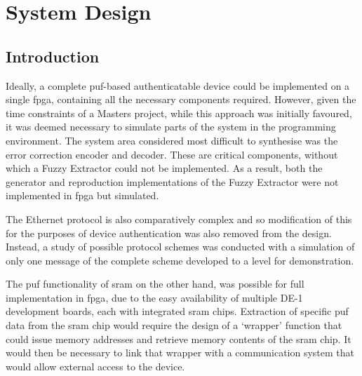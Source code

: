 
\chapter{System Design} %

\label{ch:design}



\section{Introduction}

Ideally, a complete \gls{puf}-based authenticatable device could be implemented
on a single \gls{fpga}, containing all the necessary components required.
However, given the time constraints of a Masters project, while this approach
was initially favoured, it was deemed necessary to simulate parts of the system
in the \matlab programming environment. The system area considered most
difficult to synthesise was the error correction encoder and decoder.
These are critical components, without which a Fuzzy Extractor could not be implemented.
As a result, both the generator and reproduction implementations of the Fuzzy Extractor
were not implemented in \gls{fpga} but simulated.

The Ethernet protocol is also comparatively complex and so modification of this
for the purposes of device authentication was also removed from the design.
Instead, a study of possible protocol schemes was conducted with
a simulation of only one message of the complete scheme developed to a level
for demonstration.

The \gls{puf} functionality of \gls{sram} on the other hand,
 was possible for full implementation in \gls{fpga}, due to the easy
availability of multiple DE-1 development boards, each with integrated \gls{sram} chips.
Extraction of specific \gls{puf} data from the \gls{sram} chip would require the design of
a `wrapper' function that could issue memory addresses and retrieve memory
contents of the \gls{sram} chip. It would then be necessary to link that wrapper
with a communication system that would allow external access to the device.

